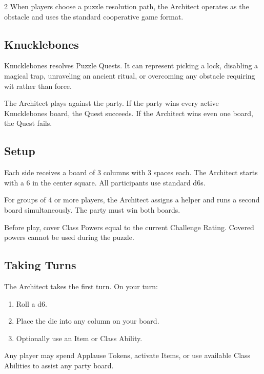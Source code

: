 \begin{multicols}{2}
When players choose a puzzle resolution path, the Architect operates as the obstacle and uses the standard cooperative game format.

\subsection*{Knucklebones}
Knucklebones resolves Puzzle Quests. It can represent picking a lock, disabling a magical trap, unraveling an ancient ritual, or overcoming any obstacle requiring wit rather than force.

The Architect plays against the party. If the party wins every active Knucklebones board, the Quest succeeds. If the Architect wins even one board, the Quest fails.

\subsection*{Setup}
Each side receives a board of 3 columns with 3 spaces each. The Architect starts with a 6 in the center square. All participants use standard d6s.

For groups of 4 or more players, the Architect assigns a helper and runs a second board simultaneously. The party must win both boards.

Before play, cover Class Powers equal to the current Challenge Rating. Covered powers cannot be used during the puzzle.

\subsection*{Taking Turns}
The Architect takes the first turn. On your turn:
\begin{enumerate}
  \item Roll a d6.
  \item Place the die into any column on your board.
  \item Optionally use an Item or Class Ability.
\end{enumerate}
Any player may spend Applause Tokens, activate Items, or use available Class Abilities to assist any party board.



\end{multicols}
